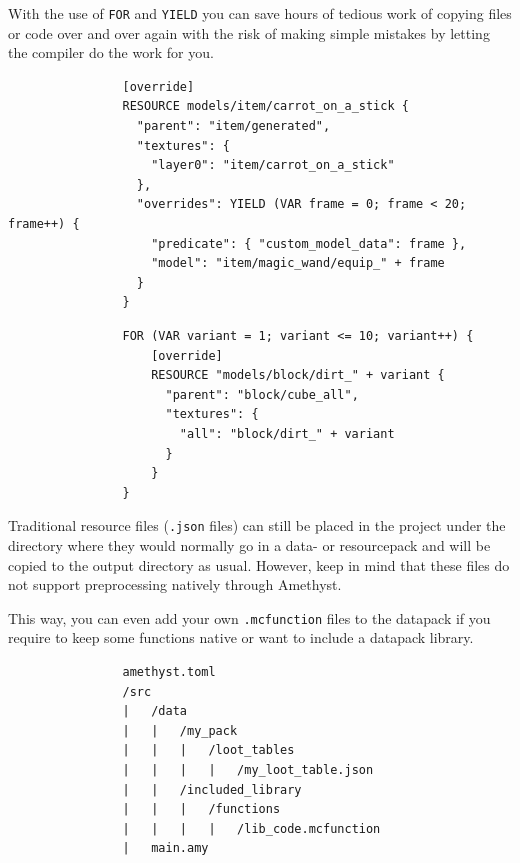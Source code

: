 \documentclass[12pt]{article}
\begin{document}
            With the use of \lstinline{FOR} and \lstinline{YIELD} you can save hours of tedious work of copying files or code over and over again with the risk of making simple mistakes by letting the compiler do the work for you.
            
            \begin{lstlisting}
                [override]
                RESOURCE models/item/carrot_on_a_stick {
                  "parent": "item/generated",
                  "textures": {
                    "layer0": "item/carrot_on_a_stick"
                  },
                  "overrides": YIELD (VAR frame = 0; frame < 20; frame++) {
                    "predicate": { "custom_model_data": frame }, 
                    "model": "item/magic_wand/equip_" + frame 
                  }
                }
            \end{lstlisting}
            
            \begin{lstlisting}
                FOR (VAR variant = 1; variant <= 10; variant++) {
                    [override]
                    RESOURCE "models/block/dirt_" + variant {
                      "parent": "block/cube_all",
                      "textures": {
                        "all": "block/dirt_" + variant
                      }
                    }
                }
            \end{lstlisting}
            
            Traditional resource files (\lstinline{.json} files) can still be placed in the project under the directory where they would normally go in a data- or resourcepack and will be copied to the output directory as usual. However, keep in mind that these files do not support preprocessing natively through Amethyst.
            
            This way, you can even add your own \lstinline{.mcfunction} files to the datapack if you require to keep some functions native or want to include a datapack library.
            
            \begin{lstlisting}
                amethyst.toml
                /src
                |   /data
                |   |   /my_pack
                |   |   |   /loot_tables
                |   |   |   |   /my_loot_table.json
                |   |   /included_library
                |   |   |   /functions
                |   |   |   |   /lib_code.mcfunction
                |   main.amy
            \end{lstlisting}
            
\end{document}
